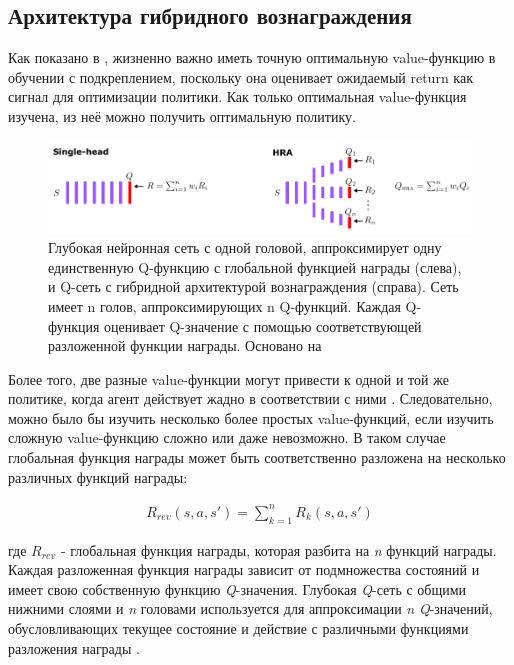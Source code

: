 \subsection{Архитектура гибридного вознаграждения} %

Как показано в \cite{seijen2017hybrid}, жизненно важно иметь точную оптимальную value-функцию в обучении с подкреплением, поскольку она оценивает ожидаемый return как сигнал для оптимизации политики. Как только оптимальная value-функция изучена, из неё можно получить оптимальную политику.

\begin{figure}[ht!]
    \center
    \includegraphics [scale=0.80] {my_folder/images/ch2/hybrid-reward.png}
    \caption{Глубокая нейронная сеть с одной головой, аппроксимирует одну единственную Q-функцию с глобальной функцией награды (слева), и Q-сеть с гибридной архитектурой вознаграждения (справа). Сеть имеет n голов, аппроксимирующих n Q-функций. Каждая Q-функция оценивает Q-значение с помощью соответствующей разложенной функции награды. Основано на \cite{seijen2017hybrid}}
    \label{fig:ch2-hybrid-reward}
\end{figure} %

Более того, две разные value-функции могут привести к одной и той же политике, когда агент действует жадно в соответствии с ними \cite{seijen2017hybrid}. Следовательно, можно было бы изучить несколько более простых value-функций, если изучить сложную value-функцию сложно или даже невозможно. В таком случае глобальная функция награды может быть соответственно разложена на несколько различных функций награды:

\begin{equation}
    \begin{multlined}
        R_{rev}(s, a, s') = \sum^n_{k=1} R_k (s, a, s')
    \end{multlined}
\end{equation}

где $R_{rev}$ - глобальная функция награды, которая разбита на \textit{n} функций награды. Каждая разложенная функция награды зависит от подмножества состояний и имеет свою собственную функцию \textit{Q}-значения. Глубокая \textit{Q}-сеть с общими нижними слоями и \textit{n} головами используется для аппроксимации \textit{n} \textit{Q}-значений, обусловливающих текущее состояние и действие с различными функциями разложения награды .

